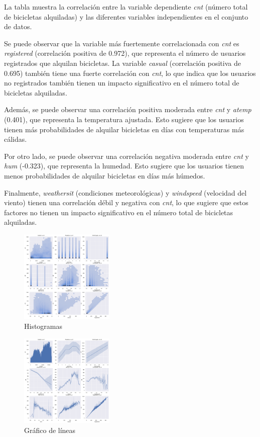 \documentclass{wsdcr}
\begin{document}
La tabla muestra la correlación entre la variable dependiente \textit{cnt} (número total de bicicletas alquiladas) y las diferentes variables independientes en el conjunto de datos.

Se puede observar que la variable más fuertemente correlacionada con \textit{cnt} es \textit{registered} (correlación positiva de 0.972), que representa el número de usuarios registrados que alquilan bicicletas. La variable \textit{casual} (correlación positiva de 0.695) también tiene una fuerte correlación con \textit{cnt}, lo que indica que los usuarios no registrados también tienen un impacto significativo en el número total de bicicletas alquiladas.

Además, se puede observar una correlación positiva moderada entre \textit{cnt} y \textit{atemp} (0.401), que representa la temperatura ajustada. Esto sugiere que los usuarios tienen más probabilidades de alquilar bicicletas en días con temperaturas más cálidas.

Por otro lado, se puede observar una correlación negativa moderada entre \textit{cnt} y \textit{hum} (-0.323), que representa la humedad. Esto sugiere que los usuarios tienen menos probabilidades de alquilar bicicletas en días más húmedos.

Finalmente, \textit{weathersit} (condiciones meteorológicas) y \textit{windspeed} (velocidad del viento) tienen una correlación débil y negativa con \textit{cnt}, lo que sugiere que estos factores no tienen un impacto significativo en el número total de bicicletas alquiladas.


\begin{figure}[h]
    \centering
    \includegraphics[width=0.4\textwidth]{charts/histograms.png}
    \caption{Histogramas}
    \label{fig:histograms}
\end{figure}

\begin{figure}[h]
    \centering
    \includegraphics[width=0.4\textwidth]{charts/line-charts.png}
    \caption{Gráfico de líneas}
    \label{fig:linecharts}
\end{figure}
\end{document}

